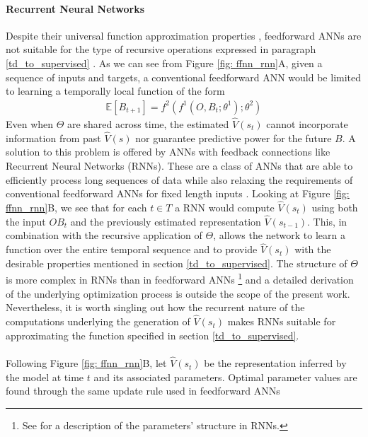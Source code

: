 \paragraph*{\textbf{Recurrent Neural Networks}}
\label{rnn_theory}
Despite their universal function approximation properties \cite{hornik1989multilayer}, feedforward ANNs are not suitable for the type of recursive operations expressed in paragraph \ref{td_to_supervised} \cite{bengio2017deep}. As we can see from Figure \ref{fig: ffnn_rnn}A, given a sequence of inputs and targets, a conventional feedforward ANN would be limited to learning a temporally local function of the form
\begin{gather}
\label{td_ffnn}
    \mathbb{E}[B_{t+1}] = f^2(f^1(O, B_{t}; \theta^{1}); \theta^{2})
\end{gather}
Even when $\Theta$ are shared across time, the estimated $\widehat{V}(s_t)$ cannot incorporate information from past $\widehat{V}(s)$ nor guarantee predictive power for the future $B$. A solution to this problem is offered by ANNs with feedback connections like Recurrent Neural Networks (RNNs). These  are a class of ANNs that are able to efficiently process long sequences of data while also relaxing the requirements of conventional feedforward ANNs for fixed length inputs \cite{bengio2017deep}. Looking at Figure \ref{fig: ffnn_rnn}B, we see that for each $t \in T$ a RNN would compute $\widehat{V}(s_t)$ using both the input $OB_{t}$ and the previously estimated representation $\widehat{V}(s_{t-1})$. This, in combination with the recursive application of $\Theta$, allows the network to learn a function over the entire temporal sequence and to provide $\widehat{V}(s_t)$ with the desirable properties mentioned in section \ref{td_to_supervised}. The structure of $\Theta$ is more complex in RNNs than in feedforward ANNs \footnote{See \cite{bengio2017deep} for a description of the parameters' structure in RNNs.} and a detailed derivation of the underlying optimization process is outside the scope of the present work. Nevertheless, it is worth singling out how the recurrent nature of the computations underlying the generation of $\widehat{V}(s_t)$  makes RNNs suitable for approximating the function specified in section \ref{td_to_supervised}. \\
\\
Following Figure \ref{fig: ffnn_rnn}B, let $\widehat{V}(s_t)$ be the representation inferred by the model at time $t$ and its associated parameters. Optimal parameter values are found through the same update rule used in feedforward ANNs

